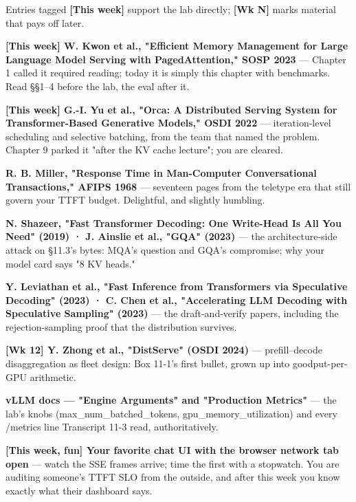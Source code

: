 
Entries tagged \textbf{[This week]} support the lab directly; \textbf{[Wk N]} marks material that pays off later.

\begin{tbbitemize}
  \item \textbf{[This week] W. Kwon et al., "Efficient Memory Management for Large Language Model Serving with PagedAttention," SOSP 2023} — Chapter 1 called it required reading; today it is simply this chapter with benchmarks. Read §§1–4 before the lab, the eval after it.
  \item \textbf{[This week] G.-I. Yu et al., "Orca: A Distributed Serving System for Transformer-Based Generative Models," OSDI 2022} — iteration-level scheduling and selective batching, from the team that named the problem. Chapter 9 parked it "after the KV cache lecture"; you are cleared.
  \item \textbf{R. B. Miller, "Response Time in Man-Computer Conversational Transactions," AFIPS 1968} — seventeen pages from the teletype era that still govern your TTFT budget. Delightful, and slightly humbling.
  \item \textbf{N. Shazeer, "Fast Transformer Decoding: One Write-Head Is All You Need" (2019) · J. Ainslie et al., "GQA" (2023)} — the architecture-side attack on §11.3's bytes: MQA's question and GQA's compromise; why your model card says "8 KV heads."
  \item \textbf{Y. Leviathan et al., "Fast Inference from Transformers via Speculative Decoding" (2023) · C. Chen et al., "Accelerating LLM Decoding with Speculative Sampling" (2023)} — the draft-and-verify papers, including the rejection-sampling proof that the distribution survives.
  \item \textbf{[Wk 12] Y. Zhong et al., "DistServe" (OSDI 2024)} — prefill–decode disaggregation as fleet design: Box 11-1's first bullet, grown up into goodput-per-GPU arithmetic.
  \item \textbf{vLLM docs — "Engine Arguments" and "Production Metrics"} — the lab's knobs (max\_num\_batched\_tokens, gpu\_memory\_utilization) and every /metrics line Transcript 11-3 read, authoritatively.
  \item \textbf{[This week, fun] Your favorite chat UI with the browser network tab open} — watch the SSE frames arrive; time the first with a stopwatch. You are auditing someone's TTFT SLO from the outside, and after this week you know exactly what their dashboard says.
\end{tbbitemize}

